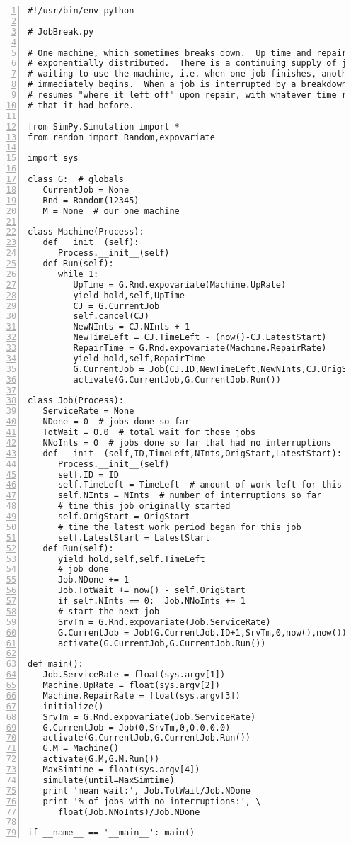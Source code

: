 \documentclass[11pt]{article}
\begin{document}
\begin{Verbatim}[fontsize=\relsize{-2},numbers=left]
#!/usr/bin/env python

# JobBreak.py

# One machine, which sometimes breaks down.  Up time and repair time are
# exponentially distributed.  There is a continuing supply of jobs
# waiting to use the machine, i.e. when one job finishes, another
# immediately begins.  When a job is interrupted by a breakdown, it
# resumes "where it left off" upon repair, with whatever time remaining
# that it had before.

from SimPy.Simulation import *
from random import Random,expovariate

import sys

class G:  # globals
   CurrentJob = None
   Rnd = Random(12345)
   M = None  # our one machine

class Machine(Process):
   def __init__(self):
      Process.__init__(self)  
   def Run(self):
      while 1:
         UpTime = G.Rnd.expovariate(Machine.UpRate)
         yield hold,self,UpTime
         CJ = G.CurrentJob
         self.cancel(CJ)
         NewNInts = CJ.NInts + 1
         NewTimeLeft = CJ.TimeLeft - (now()-CJ.LatestStart)
         RepairTime = G.Rnd.expovariate(Machine.RepairRate)
         yield hold,self,RepairTime
         G.CurrentJob = Job(CJ.ID,NewTimeLeft,NewNInts,CJ.OrigStart,now()) 
         activate(G.CurrentJob,G.CurrentJob.Run())

class Job(Process):
   ServiceRate = None
   NDone = 0  # jobs done so far
   TotWait = 0.0  # total wait for those jobs
   NNoInts = 0  # jobs done so far that had no interruptions
   def __init__(self,ID,TimeLeft,NInts,OrigStart,LatestStart):
      Process.__init__(self)  
      self.ID = ID
      self.TimeLeft = TimeLeft  # amount of work left for this job
      self.NInts = NInts  # number of interruptions so far
      # time this job originally started
      self.OrigStart = OrigStart
      # time the latest work period began for this job
      self.LatestStart = LatestStart
   def Run(self):
      yield hold,self,self.TimeLeft
      # job done 
      Job.NDone += 1
      Job.TotWait += now() - self.OrigStart
      if self.NInts == 0:  Job.NNoInts += 1
      # start the next job
      SrvTm = G.Rnd.expovariate(Job.ServiceRate)
      G.CurrentJob = Job(G.CurrentJob.ID+1,SrvTm,0,now(),now())
      activate(G.CurrentJob,G.CurrentJob.Run())

def main():
   Job.ServiceRate = float(sys.argv[1])
   Machine.UpRate = float(sys.argv[2])
   Machine.RepairRate = float(sys.argv[3])
   initialize()
   SrvTm = G.Rnd.expovariate(Job.ServiceRate)
   G.CurrentJob = Job(0,SrvTm,0,0.0,0.0)
   activate(G.CurrentJob,G.CurrentJob.Run())
   G.M = Machine()
   activate(G.M,G.M.Run())
   MaxSimtime = float(sys.argv[4])
   simulate(until=MaxSimtime)
   print 'mean wait:', Job.TotWait/Job.NDone
   print '% of jobs with no interruptions:', \
      float(Job.NNoInts)/Job.NDone

if __name__ == '__main__': main()
\end{Verbatim}
\end{document}
